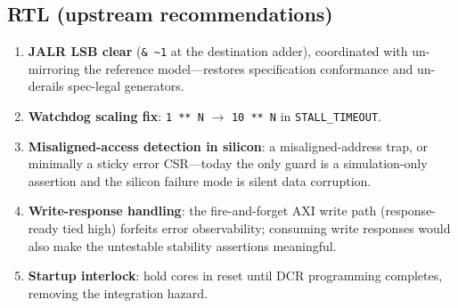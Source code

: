 \documentclass[conference]{IEEEtran}
\newcommand{\code}[1]{\texttt{\small #1}}
\begin{document}
\subsection{RTL (upstream recommendations)}
\begin{enumerate}
\item \textbf{JALR LSB clear} (\code{\&\,\~{}1} at the destination
adder), coordinated with un-mirroring the reference model---restores
specification conformance and un-derails spec-legal generators.
\item \textbf{Watchdog scaling fix}: \code{1\,**\,N} $\to$
\code{10\,**\,N} in \code{STALL\_TIMEOUT}.
\item \textbf{Misaligned-access detection in silicon}: a
misaligned-address trap, or minimally a sticky error CSR---today the
only guard is a simulation-only assertion and the silicon failure mode
is silent data corruption.
\item \textbf{Write-response handling}: the fire-and-forget AXI write
path (response-ready tied high) forfeits error observability; consuming
write responses would also make the untestable stability assertions
meaningful.
\item \textbf{Startup interlock}: hold cores in reset until DCR
programming completes, removing the integration hazard.
\end{enumerate}
\end{document}
